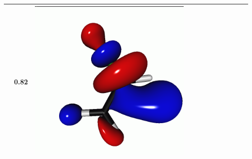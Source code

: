 \documentclass[journal=jctcce,manuscript=article]{achemso}
\begin{document}
\begin{table}[H]
\begin{tabular}{c|ccc|cccc|cccc}
\begin{minipage}{0.2\textwidth}
     \end{minipage}
     & 0.82
     &  \begin{minipage}{0.2\textwidth}
         \centering
         \includegraphics[scale=0.10]{NTO/CH2CHF/11p.png}
     \end{minipage}
     \\
     \hline
 \end{tabular}
 \end{table}
\end{document}
